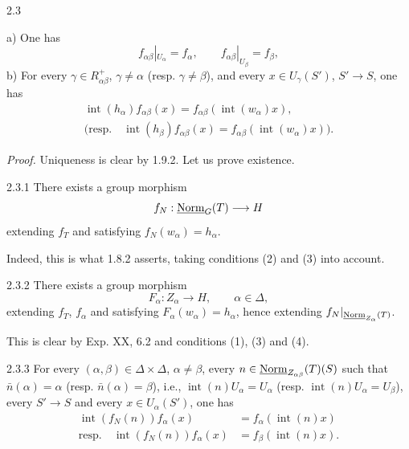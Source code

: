 \begin{theorem}{2.3}
\begin{enumeratei}
 a) One has
\begin{equation}\tag{5}
f_{\alpha\beta}|_{U_\alpha}=f_\alpha,\qquad f_{\alpha\beta}|_{U_\beta}=f_\beta,
\end{equation}
 b) For every $\gamma\in R^+_{\alpha\beta}$, $\gamma\ne\alpha$ (resp. $\gamma\ne\beta$), and every $x\in U_\gamma(S')$, $S'\to S$, one has
\begin{equation}\tag{6}
\begin{gathered}
\operatorname{int}(h_\alpha)f_{\alpha\beta}(x)=f_{\alpha\beta}(\operatorname{int}(w_\alpha)x),\\
\text{(resp.}\quad\operatorname{int}(h_\beta)f_{\alpha\beta}(x)=f_{\alpha\beta}(\operatorname{int}(w_\alpha)x)\text{).}
\end{gathered}
\end{equation}
\end{enumeratei}
\end{theorem}
\emph{Proof.} Uniqueness is clear by 1.9.2. Let us prove existence.
\begin{lemma}{2.3.1}\label{XXIII.2.3.1}
There exists a group morphism
\[
f_N:\underline{\mathrm{Norm}}_G(T)\longrightarrow H
\]
extending $f_T$ and satisfying $f_N(w_\alpha)=h_\alpha$.
\end{lemma}
Indeed, this is what 1.8.2 asserts, taking conditions (2) and (3) into account.
\begin{lemma}{2.3.2}\label{XXIII.2.3.2}
There exists a group morphism
\[
F_\alpha:Z_\alpha\to H,\qquad\alpha\in\Delta,
\]
extending $f_T$, $f_\alpha$ and satisfying $F_\alpha(w_\alpha)=h_\alpha$, hence extending $f_N|_{\underline{\mathrm{Norm}}_{Z_\alpha}(T)}$.
\end{lemma}
This is clear by Exp. XX, 6.2 and conditions (1), (3) and (4).
\begin{lemma}{2.3.3}\label{XXIII.2.3.3}
For every $(\alpha,\beta)\in\Delta\times\Delta$, $\alpha\ne\beta$, every $n\in\underline{\mathrm{Norm}}_{Z_{\alpha\beta}}(T)(S)$ such that $\bar n(\alpha)=\alpha$ (resp. $\bar n(\alpha)=\beta$), i.e., $\operatorname{int}(n)U_\alpha=U_\alpha$ (resp. $\operatorname{int}(n)U_\alpha=U_\beta$), every $S'\to S$ and every $x\in U_\alpha(S')$, one has
\[
\begin{aligned}
\operatorname{int}(f_N(n))f_\alpha(x)&=f_\alpha(\operatorname{int}(n)x)\\
\text{resp.}\quad\operatorname{int}(f_N(n))f_\alpha(x)&=f_\beta(\operatorname{int}(n)x).
\end{aligned}
\]
\end{lemma}
